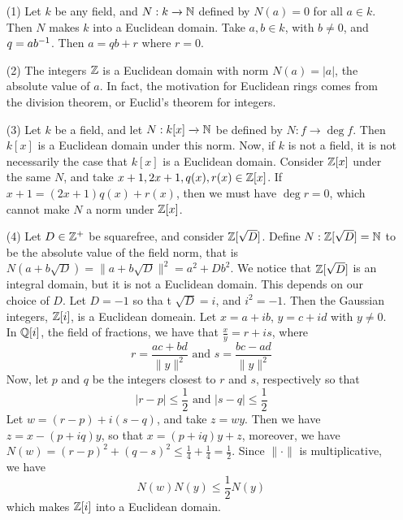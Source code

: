 \begin{example}\label{2.1}
    \begin{enumerate}
        \item[(1)] Let $k$ be any field, and  $N:k \xrightarrow{} \mathbb{N}$ defined by
            $N(a)=0$ for all $a \in k$. Then  $N$ makes  $k$ into a Euclidean
            domain. Take  $a,b \in k$, with  $b \neq 0$, and  $q=ab^{-1}$. Then
            $a=qb+r$ where  $r=0$.

        \item[(2)] The integers $\mathbb{Z}$ is a Euclidean domain with norm $N(a)=|a|$,
            the absolute value of $a$. In fact, the motivation for Euclidean
            rings comes from the division theorem, or Euclid's theorem for
            integers.

        \item[(3)] Let $k$ be a field, and let $N:k[x] \xrightarrow{} \mathbb{N}$ be
          defined by $N:f \xrightarrow{} \deg{f}$. Then $k[x]$ is a Euclidean
          domain under this norm. Now, if $k$ is not a field, it is not
          necessarily the case that  $k[x]$ is a Euclidean domain. Consider
          $\mathbb{Z}[x]$ under the same $N$, and take $x+1,2x+1,q(x),r(x) \in \mathbb{Z}[x]$.
          If $x+1=(2x+1)q(x)+r(x)$, then we must have $\deg{r}=0$, which cannot
          make $N$ a norm under $\mathbb{Z}[x]$.

        \item[(4)] Let $D \in \mathbb{Z}^+$ be squarefree, and consider  $\mathbb{Z}[\sqrt{D}]$.
            Define $N:\mathbb{Z}[\sqrt{D}]=\mathbb{N}$ to be the absolute value of the field
            norm, that is $N(a+b\sqrt{D})=\|a+b\sqrt{D}\|^2=a^2+Db^2$. We notice
            that $\mathbb{Z}[\sqrt{D}]$ is an integral domain, but it is not a Euclidean
            domain. This depends on our choice of $D$. Let  $D=-1$ so tha t
            $\sqrt{D}=i$, and $i^2=-1$. Then the Gaussian integers, $\mathbb{Z}[i]$, is
            a Euclidean domeain. Let $x=a+ib$,  $y=c+id$ with  $y \neq 0$. In
            $\mathbb{Q}[i]$, the field of fractions, we have that $\frac{x}{y}=r+is$,
            where
            \begin{equation*}
                r=\frac{ac+bd}{\|y\|^2} \text{ and } s=\frac{bc-ad}{\|y\|^2}
            \end{equation*}
            Now, let $p$ and  $q$ be the integers closest to $r$ and $s$,
            respectively so that
            \begin{equation*}
                |r-p| \leq \frac{1}{2} \text{ and } |s-q| \leq \frac{1}{2}
            \end{equation*}
            Let $w=(r-p)+i(s-q)$, and take $z=wy$. Then we have  $z=x-(p+iq)y$,
            so that $x=(p+iq)y+z$, moreover, we have $N(w)=(r-p)^2+(q-s)^2 \leq
            \frac{1}{4}+\frac{1}{4}=\frac{1}{2}$. Since $\|\cdot\|$ is
            multiplicative, we have
            \begin{equation*}
                N(w)N(y) \leq \frac{1}{2}N(y)
            \end{equation*}
            which makes $\mathbb{Z}[i]$ into a Euclidean domain.
    \end{enumerate}
\end{example}

